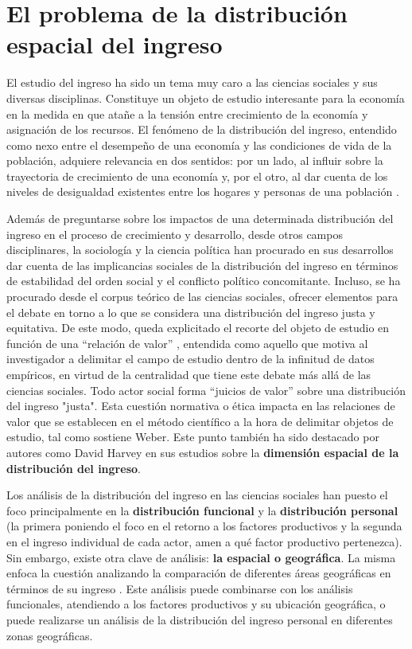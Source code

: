 
\section{El problema de la distribución espacial del ingreso}
	
El estudio del ingreso ha sido un tema muy caro a las ciencias sociales y sus diversas disciplinas. Constituye un objeto de estudio interesante para la economía en la medida en que atañe a la tensión entre crecimiento de la economía y asignación de los recursos. El fenómeno de la distribución del ingreso, entendido como nexo entre el desempeño de una economía y las condiciones de vida de la población, adquiere relevancia en dos sentidos: por un lado, al influir sobre la trayectoria de crecimiento de una economía y, por el otro, al dar cuenta de los niveles de desigualdad existentes entre los hogares y personas de una población \cite{giayetto}. 

Además de preguntarse sobre los impactos de una determinada distribución del ingreso en el proceso de crecimiento y desarrollo, desde otros campos disciplinares, la sociología y la ciencia política han procurado en sus desarrollos dar cuenta de las implicancias sociales de la distribución del ingreso en términos de estabilidad del orden social y el conflicto político concomitante. Incluso, se ha procurado desde el corpus teórico de las ciencias sociales, ofrecer elementos para el debate en torno a lo que se considera una distribución del ingreso justa y equitativa. De este modo, queda explicitado el recorte del objeto de estudio en función de una “relación de valor” \cite{weber}, entendida como aquello que motiva al investigador a delimitar el campo de estudio dentro de la infinitud de datos empíricos, en virtud de la centralidad que tiene este debate más allá de las ciencias sociales. Todo actor social forma “juicios de valor” \cite{weber} sobre una distribución del ingreso "justa". Esta cuestión normativa o ética impacta en las relaciones de valor que se establecen en el método científico a la hora de delimitar objetos de estudio, tal como sostiene Weber. Este punto también ha sido destacado por autores como David Harvey \citeyear{harvey} en sus estudios sobre la \textbf{dimensión espacial de la distribución del ingreso}. 

Los análisis de la distribución del ingreso en las ciencias sociales han puesto el foco principalmente en la \textbf{distribución funcional} y la \textbf{distribución personal} (la primera poniendo el foco en el retorno a los factores productivos y la segunda en el ingreso individual de cada actor, amen a qué factor productivo pertenezca). Sin embargo, existe otra clave de análisis: \textbf{la espacial o geográfica}. La misma enfoca la cuestión analizando la comparación de diferentes áreas geográficas en términos de su ingreso \cite{gasparini2001}. Este análisis puede combinarse con los análisis funcionales, atendiendo a los factores productivos y su ubicación geográfica, o puede realizarse un análisis de la distribución del ingreso personal en diferentes zonas geográficas. 

